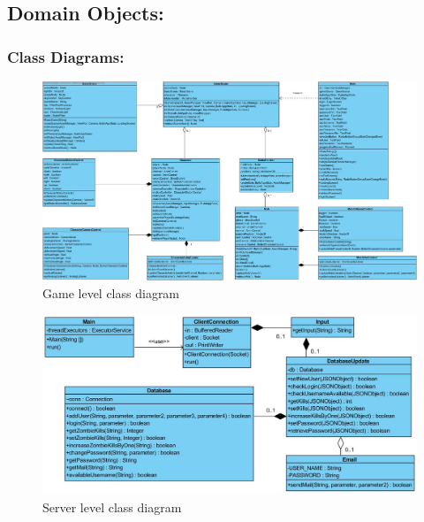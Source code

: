 \documentclass[letterpaper]{article}
\begin{document}
			
			
			\vspace{0.2in}
			\subsection*{Domain Objects:}
			\vspace{0.1in}
			
				\vspace{0.2in}
				\subsubsection*{Class Diagrams:}
				\vspace{0.1in}
				
					\begin{figure}[H]
					\centering
					\includegraphics[width=180mm]{UML_Diagram/Class/Game_Classes.jpg}
					\caption{Game level class diagram}
					\label{overflow}
					\end{figure}
					
					\begin{figure}[H]
					\centering
					\includegraphics[width=180mm]{UML_Diagram/Class/Server_Classes.jpg}
					\caption{Server level class diagram}
					\label{overflow}
					\end{figure}
					
\end{document}
